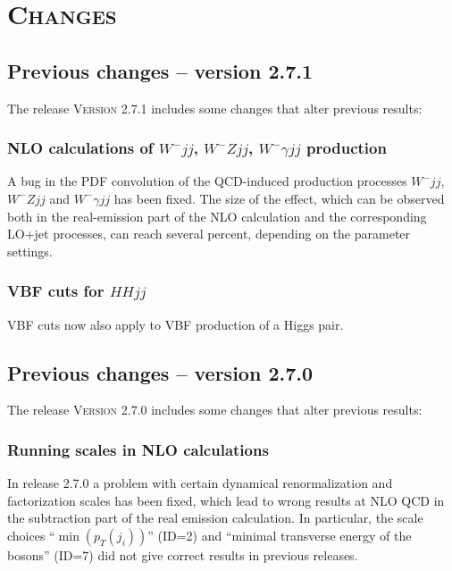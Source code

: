 \documentclass[english,12pt]{article}
\begin{document}
\newpage

\section{\textsc{Changes}}




\subsection{Previous changes -- version 2.7.1}

The release \textsc{Version 2.7.1} includes some changes that alter previous results:


\subsubsection{NLO calculations of $W^-jj$, $W^-Zjj$, $W^-\gamma jj$ production}

A bug in the PDF convolution of the QCD-induced production processes $W^-jj$,
$W^-Zjj$ and $W^-\gamma jj$ has been fixed. The size of the effect,
which can be observed both in the real-emission part of the NLO
calculation and the corresponding LO+jet processes, can reach several
percent, depending on the parameter settings.


\subsubsection{VBF cuts for $HHjj$}

VBF cuts now also apply to VBF production of a Higgs pair.


\subsection{Previous changes -- version 2.7.0}

The release \textsc{Version 2.7.0} includes some changes that alter previous results:


\subsubsection{Running scales in NLO calculations}

In release 2.7.0 a problem with certain dynamical renormalization and factorization
scales has been fixed, which lead to wrong results at NLO QCD in the subtraction part of the
real emission calculation. In particular, the scale choices ``$\min(p_T(j_i))$'' (ID=2)
and ``minimal transverse energy of the bosons'' (ID=7) did not give correct results
in previous releases.
\end{document}
